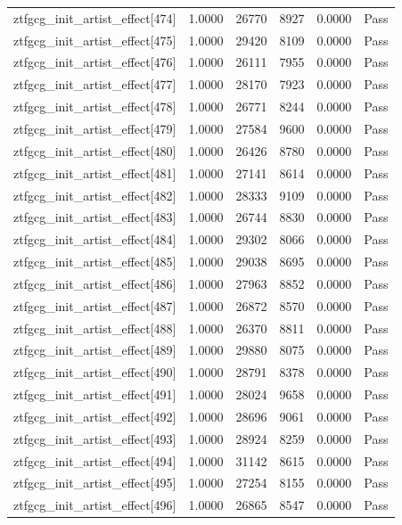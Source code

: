 \begin{table}[htbp]
\begin{tabular}{llrrll}
ztfgcg\_init\_artist\_effect[474] & 1.0000 & 26770 & 8927 & 0.0000 & Pass \\
ztfgcg\_init\_artist\_effect[475] & 1.0000 & 29420 & 8109 & 0.0000 & Pass \\
ztfgcg\_init\_artist\_effect[476] & 1.0000 & 26111 & 7955 & 0.0000 & Pass \\
ztfgcg\_init\_artist\_effect[477] & 1.0000 & 28170 & 7923 & 0.0000 & Pass \\
ztfgcg\_init\_artist\_effect[478] & 1.0000 & 26771 & 8244 & 0.0000 & Pass \\
ztfgcg\_init\_artist\_effect[479] & 1.0000 & 27584 & 9600 & 0.0000 & Pass \\
ztfgcg\_init\_artist\_effect[480] & 1.0000 & 26426 & 8780 & 0.0000 & Pass \\
ztfgcg\_init\_artist\_effect[481] & 1.0000 & 27141 & 8614 & 0.0000 & Pass \\
ztfgcg\_init\_artist\_effect[482] & 1.0000 & 28333 & 9109 & 0.0000 & Pass \\
ztfgcg\_init\_artist\_effect[483] & 1.0000 & 26744 & 8830 & 0.0000 & Pass \\
ztfgcg\_init\_artist\_effect[484] & 1.0000 & 29302 & 8066 & 0.0000 & Pass \\
ztfgcg\_init\_artist\_effect[485] & 1.0000 & 29038 & 8695 & 0.0000 & Pass \\
ztfgcg\_init\_artist\_effect[486] & 1.0000 & 27963 & 8852 & 0.0000 & Pass \\
ztfgcg\_init\_artist\_effect[487] & 1.0000 & 26872 & 8570 & 0.0000 & Pass \\
ztfgcg\_init\_artist\_effect[488] & 1.0000 & 26370 & 8811 & 0.0000 & Pass \\
ztfgcg\_init\_artist\_effect[489] & 1.0000 & 29880 & 8075 & 0.0000 & Pass \\
ztfgcg\_init\_artist\_effect[490] & 1.0000 & 28791 & 8378 & 0.0000 & Pass \\
ztfgcg\_init\_artist\_effect[491] & 1.0000 & 28024 & 9658 & 0.0000 & Pass \\
ztfgcg\_init\_artist\_effect[492] & 1.0000 & 28696 & 9061 & 0.0000 & Pass \\
ztfgcg\_init\_artist\_effect[493] & 1.0000 & 28924 & 8259 & 0.0000 & Pass \\
ztfgcg\_init\_artist\_effect[494] & 1.0000 & 31142 & 8615 & 0.0000 & Pass \\
ztfgcg\_init\_artist\_effect[495] & 1.0000 & 27254 & 8155 & 0.0000 & Pass \\
ztfgcg\_init\_artist\_effect[496] & 1.0000 & 26865 & 8547 & 0.0000 & Pass \\

\end{tabular}
\end{table}
